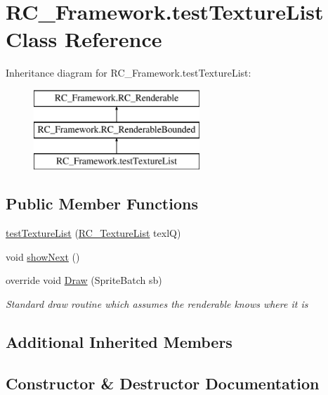 \hypertarget{class_r_c___framework_1_1test_texture_list}{}\section{R\+C\+\_\+\+Framework.\+test\+Texture\+List Class Reference}
\label{class_r_c___framework_1_1test_texture_list}
Inheritance diagram for R\+C\+\_\+\+Framework.\+test\+Texture\+List\+:\begin{figure}[H]
\begin{center}
\leavevmode
\includegraphics[height=3.000000cm]{class_r_c___framework_1_1test_texture_list}
\end{center}
\end{figure}
\subsection*{Public Member Functions}
\begin{DoxyCompactItemize}
\item 
\mbox{\hyperlink{class_r_c___framework_1_1test_texture_list_a8a950dd5e6f713ac2c70fb4ea89374b9}{test\+Texture\+List}} (\mbox{\hyperlink{class_r_c___framework_1_1_r_c___texture_list}{R\+C\+\_\+\+Texture\+List}} texlQ)
\item 
void \mbox{\hyperlink{class_r_c___framework_1_1test_texture_list_adc0c48ff10e27cd89b8e80fa0595d2f1}{show\+Next}} ()
\item 
override void \mbox{\hyperlink{class_r_c___framework_1_1test_texture_list_ad9d3cd0a926c420d493e2a92fdadcab1}{Draw}} (Sprite\+Batch sb)
\begin{DoxyCompactList}\small\item\em Standard draw routine which assumes the renderable knows where it is \end{DoxyCompactList}\end{DoxyCompactItemize}
\subsection*{Additional Inherited Members}


\subsection{Constructor \& Destructor Documentation}
\mbox{\label{class_r_c___framework_1_1test_texture_list_a8a950dd5e6f713ac2c70fb4ea89374b9}} 
